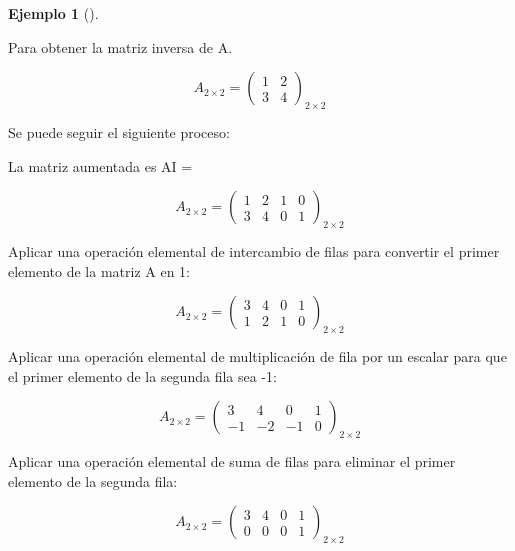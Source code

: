 \documentclass[
  letterpaper,
  DIV=11,
  numbers=noendperiod]{scrreprt}
\theoremstyle{definition}
\newtheorem{example}{Ejemplo}[chapter]
\theoremstyle{definition}
\theoremstyle{remark}
\begin{document}
\begin{example}[]\protect\hypertarget{exm-ejemplo1}{}\label{exm-ejemplo1}

Para obtener la matriz inversa de A.

\begin{equation*}
A_{2 \times 2}=
\begin{pmatrix}
1 & 2 \\
3 & 4 
\end{pmatrix} _{2 \times 2}
\end{equation*}

Se puede seguir el siguiente proceso:

La matriz aumentada es A\textbar I =

\begin{equation*}
A_{2 \times 2}=
\begin{pmatrix}
1 & 2 & 1 & 0 \\
3 & 4 & 0 & 1 
\end{pmatrix} _{2 \times 2}
\end{equation*}

Aplicar una operación elemental de intercambio de filas para convertir
el primer elemento de la matriz A en 1:

\begin{equation*}
A_{2 \times 2}=
\begin{pmatrix}
3 & 4 & 0 & 1 \\
1 & 2 & 1 & 0 
\end{pmatrix} _{2 \times 2}
\end{equation*}

Aplicar una operación elemental de multiplicación de fila por un escalar
para que el primer elemento de la segunda fila sea -1:

\begin{equation*}
A_{2 \times 2}=
\begin{pmatrix}
3 & 4 & 0 & 1 \\
-1 & -2 & -1 & 0 
\end{pmatrix} _{2 \times 2}
\end{equation*}

Aplicar una operación elemental de suma de filas para eliminar el primer
elemento de la segunda fila:

\begin{equation*}
A_{2 \times 2}=
\begin{pmatrix}
3 & 4 & 0 & 1 \\
0 & 0 & 0 & 1 
\end{pmatrix} _{2 \times 2}
\end{equation*}


\end{example}
\end{document}
